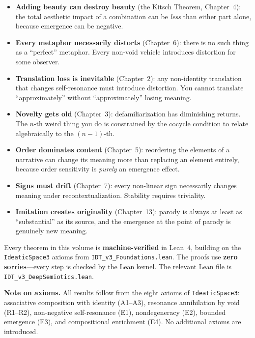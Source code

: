 \documentclass[11pt,oneside]{book}
\theoremstyle{plain}
\theoremstyle{definition}
\theoremstyle{remark}
\begin{document}
\begin{itemize}[leftmargin=2em]
\item \textbf{Adding beauty can destroy beauty} (the Kitsch Theorem,
  Chapter~4): the total aesthetic impact of a combination can be
  \emph{less} than either part alone, because emergence can be negative.

\item \textbf{Every metaphor necessarily distorts} (Chapter~6): there
  is no such thing as a ``perfect'' metaphor.  Every non-void vehicle
  introduces distortion for some observer.

\item \textbf{Translation loss is inevitable} (Chapter~2): any
  non-identity translation that changes self-resonance must introduce
  distortion.  You cannot translate ``approximately'' without
  ``approximately'' losing meaning.

\item \textbf{Novelty gets old} (Chapter~3): defamiliarization has
  diminishing returns.  The $n$-th weird thing you do is constrained by
  the cocycle condition to relate algebraically to the $(n{-}1)$-th.

\item \textbf{Order dominates content} (Chapter~5): reordering the
  elements of a narrative can change its meaning more than replacing
  an element entirely, because order sensitivity is \emph{purely}
  an emergence effect.

\item \textbf{Signs must drift} (Chapter~7): every non-linear sign
  necessarily changes meaning under recontextualization.  Stability
  requires triviality.

\item \textbf{Imitation creates originality} (Chapter~13): parody
  is always at least as ``substantial'' as its source, and the
  emergence at the point of parody is genuinely new meaning.
\end{itemize}

Every theorem in this volume is \textbf{machine-verified} in Lean~4,
building on the \texttt{IdeaticSpace3} axioms from
\texttt{IDT\_v3\_Foundations.lean}.  The proofs use \textbf{zero
sorries}---every step is checked by the Lean kernel.  The relevant
Lean file is \texttt{IDT\_v3\_DeepSemiotics.lean}.

\vspace{1em}

\noindent\textbf{Note on axioms.}  All results follow from the eight
axioms of \texttt{IdeaticSpace3}: associative composition with identity
(A1--A3), resonance annihilation by void (R1--R2), non-negative
self-resonance (E1), nondegeneracy (E2), bounded emergence (E3), and
compositional enrichment (E4).  No additional axioms are introduced.
\end{document}
